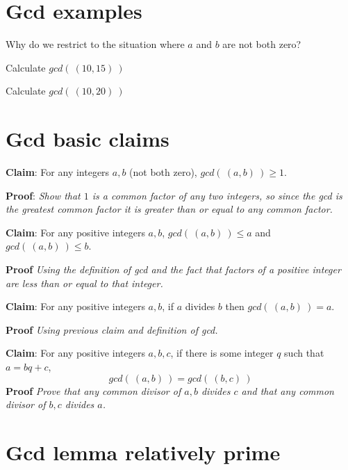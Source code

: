 \documentclass[12pt, oneside]{article}
\begin{document}
\section*{Gcd examples}


Why do we restrict to the situation where $a$ and $b$ are not both zero?

\vspace{50pt}


Calculate $gcd(~(10,15)~)$

\vspace{50pt}

Calculate $gcd(~(10,20)~)$

\vspace{50pt} \vfill
\section*{Gcd basic claims}


{\bf Claim}: For any integers $a,b$ (not both zero), $gcd(~(a,b)~) \geq 1$.

{\bf Proof}: {\it Show that $1$ is a common factor of any two integers, so since the gcd 
is the greatest common factor it is greater than or equal to any common factor.}

\vspace{150pt}

{\bf Claim}: For any positive integers $a,b$, $gcd(~(a,b)~) \leq a$ and $gcd( ~(a,b)~) \leq b$.

{\bf Proof} {\it Using the definition of gcd and the fact that factors of a positive integer
are less than or equal to that integer.}

\vspace{150pt}

{\bf Claim}: For any positive integers $a,b$, if $a$ divides $b$ then $gcd(~(a,b)~) = a$.

{\bf Proof} {\it Using previous claim and definition of gcd.}

\vspace{150pt}


{\bf Claim}: For any positive integers $a,b,c$, if there is some integer $q$ such that $a = bq + c$,
\[
    gcd(~(a,b)~) = gcd (~(b,c)~)
\]
{\bf Proof} {\it Prove that any common divisor of $a,b$ divides $c$ and that any common 
divisor of $b,c$ divides $a$.}

\vspace{150pt}
 \vfill
\section*{Gcd lemma relatively prime}
\end{document}
